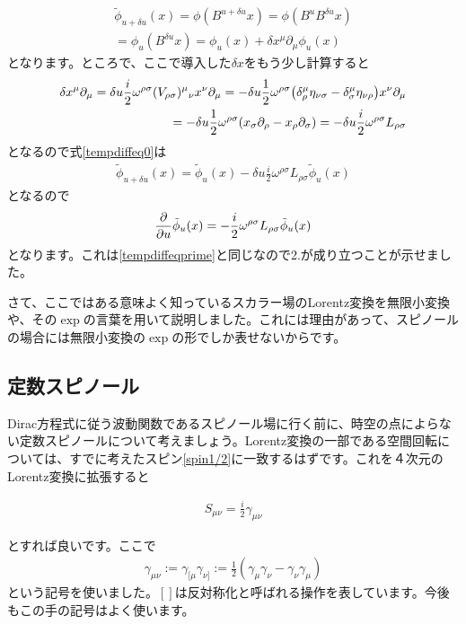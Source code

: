 \documentclass[report,paper=a4, fontsize=12pt, line_length=16cm, number_of_lines=33,dvipdfmx]{jlreq}
\newenvironment{important}{\begin{tcolorbox}[
  colback = white,
  colframe = red!35,
  boxrule = 2mm,
  fonttitle = \bfseries,
  after = \noindent] }{\end{tcolorbox}}
\numberwithin{equation}{chapter}
\newcommand{\del}{\partial}
\newcommand{\phit}{\tilde{\phi}}
\begin{document}
\begin{align}
  \phit_{u+\delta u}(x)
  =\phi(B^{u+\delta u}x)
  =\phi(B^{u}B^{\delta u}x)\nonumber\\
  =\phi_u(B^{\delta u}x)
  =\phi_u(x)+\delta x^{\mu}\del_{\mu}\phi_{u}(x)\label{tempdiffeq0}
\end{align}
となります。ところで、ここで導入した$\delta x$をもう少し計算すると
\begin{align}
  \delta x^{\mu}\del_{\mu}=\delta u\frac{i}{2}\omega^{\rho\sigma}(V_{\rho\sigma})^{\mu}{}_{\nu}x^{\nu}\del_{\mu}
  =-\delta u\frac{1}{2}\omega^{\rho\sigma}\qty(\delta^{\mu}_{\rho}\eta_{\nu\sigma}-\delta^{\mu}_{\sigma}\eta_{\nu\rho})x^{\nu}\del_{\mu}\nonumber\\
  =-\delta u\frac{1}{2}\omega^{\rho\sigma}\qty(x_{\sigma}\del_{\rho}-x_{\rho}\del_{\sigma})
  =-\delta u \frac{i}{2}\omega^{\rho\sigma}L_{\rho\sigma}
\end{align}
となるので式\eqref{tempdiffeq0}は
\begin{align}
\phit_{u+\delta u}(x)=\phit_{u}(x) - \delta u\frac{i}{2}\omega^{\rho\sigma}L_{\rho\sigma}\phit_{u}(x)
\end{align}
となるので
\begin{align}
  \pdv{u} \phit_{u}(x)=-\frac{i}{2}\omega^{\rho\sigma}L_{\rho\sigma}\phit_{u}(x)
\end{align}
となります。これは\eqref{tempdiffeqprime}と同じなので2.が成り立つことが示せました。

さて、ここではある意味よく知っているスカラー場のLorentz変換を無限小変換や、その$\exp$の言葉を用いて説明しました。これには理由があって、スピノールの場合には無限小変換の$\exp$の形でしか表せないからです。

\subsection{定数スピノール}
Dirac方程式に従う波動関数であるスピノール場に行く前に、時空の点によらない定数スピノールについて考えましょう。Lorentz変換の一部である空間回転については、すでに考えたスピン\eqref{spin1/2}に一致するはずです。これを４次元のLorentz変換に拡張すると
\begin{important}
  \begin{align}
    S_{\mu\nu}=\frac{i}{2}\gamma_{\mu\nu}
  \end{align}
\end{important}
とすれば良いです。ここで
\begin{align}
  \gamma_{\mu\nu}:=\gamma_{[\mu}\gamma_{\nu]}:=\frac{1}{2}(\gamma_{\mu}\gamma_{\nu}-\gamma_{\nu}\gamma_{\mu})
\end{align}
という記号を使いました。$[]$は反対称化と呼ばれる操作を表しています。今後もこの手の記号はよく使います。
\end{document}
